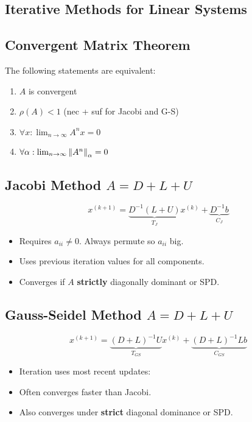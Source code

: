 \documentclass[8pt, letterpaper]{extarticle}
\begin{document}
\begin{multicols*}{3}
  \section{Iterative Methods for Linear Systems}

  \subsection{Convergent Matrix Theorem}
  The following statements are equivalent:
  \begin{enumerate}[label=(\roman*)]
    \item $A$ is convergent
    \item $\rho(A) < 1$ (nec + suf for Jacobi and G-S)
    \item $\forall x: \lim_{n \to \infty} A^nx = 0$
    \item $\forall \alpha: \lim_{n\to\infty} \norm{A^n}_\alpha = 0$
  \end{enumerate}

  \subsection{Jacobi Method $A = D + L + U$}
  \[
    x^{(k+1)} = \underbrace{D^{-1}(L+U)}_{T_J}x^{(k)} 
    + \underbrace{D^{-1}b}_{C_J}
  \]
  \begin{itemize}
    \item Requires $a_{ii} \ne 0$. Always permute so $a_{ii}$ big.
    \item Uses previous iteration values for all components.
    \item Converges if $A$ \textbf{strictly} diagonally dominant or SPD.
  \end{itemize}

  \subsection{Gauss-Seidel Method $A = D + L + U$}
  \[
    x^{(k+1)} = \underbrace{(D + L)^{-1}U}_{T_{GS}}x^{(k)} 
    + \underbrace{(D + L)^{-1}Lb}_{C_{GS}}
  \]
  \begin{itemize}
    \item Iteration uses most recent updates:
    \item Often converges faster than Jacobi.
    \item Also converges under \textbf{strict} diagonal dominance or SPD.
  \end{itemize}

\end{multicols*}
\end{document}
